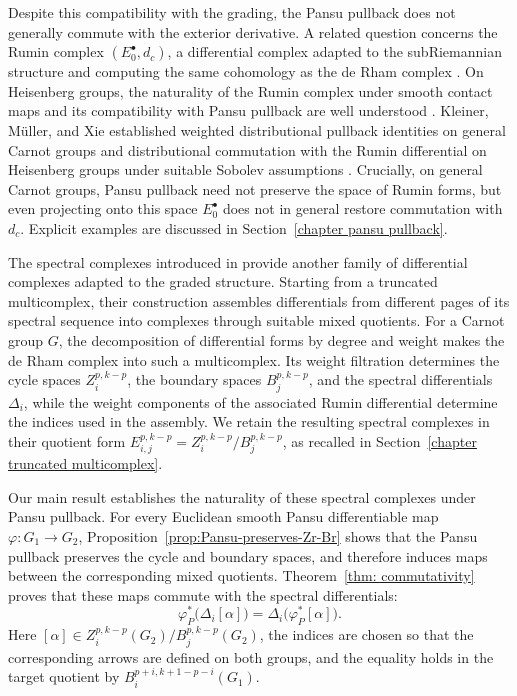 \documentclass[dvipsnames]{amsart}
\theoremstyle{definition}
\theoremstyle{definition}
\numberwithin{equation}{section}
\begin{document}
Despite this compatibility with the grading, the Pansu pullback does not generally commute with the exterior derivative. A related question concerns the Rumin complex $(E_0^\bullet,d_c)$, a differential complex adapted to the subRiemannian structure and computing the same cohomology as the de Rham complex \cite{rumin1999differential,rumin_palermo,CompensatedCompactness,FT}. On Heisenberg groups, the naturality of the Rumin complex under smooth contact maps and its compatibility with Pansu pullback are well understood \cite{canarecci2019insightrumincohomologyorientability}. Kleiner, M\"uller, and Xie established weighted distributional pullback identities on general Carnot groups and distributional commutation with the Rumin differential on Heisenberg groups under suitable Sobolev assumptions \cite{kleiner2020pansu,kleiner2021sobolevmappingsrumincomplex}. Crucially, on general Carnot groups, Pansu pullback need not preserve the space of Rumin forms, but even projecting onto this space $E_0^\bullet$ does not in general restore commutation with $d_c$. Explicit examples are discussed in Section~\ref{chapter pansu pullback}.


The spectral complexes introduced in
\cite{tripaldi2026spectralcomplexestruncatedmulticomplexes}
provide another family of differential complexes adapted
to the graded structure. Starting from a truncated
multicomplex, their construction assembles differentials
from different pages of its spectral sequence into
complexes through suitable mixed quotients. For a Carnot
group $G$, the decomposition of differential forms by
degree and weight makes the de Rham complex into such
a multicomplex. Its weight filtration determines the
cycle spaces $Z_i^{p,k-p}$, the boundary spaces
$B_j^{p,k-p}$, and the spectral differentials $\Delta_i$,
while the weight components of the associated Rumin
differential determine the indices used in the assembly.
We retain the resulting spectral complexes in their
quotient form $E_{i,j}^{p,k-p}
    =
    Z_i^{p,k-p}/B_j^{p,k-p}$,
as recalled in
Section~\ref{chapter truncated multicomplex}.

Our main result establishes the naturality of these
spectral complexes under Pansu pullback. For every
Euclidean smooth Pansu differentiable map
$\varphi:G_1\to G_2$,
Proposition~\ref{prop:Pansu-preserves-Zr-Br} shows that
the Pansu pullback preserves the cycle and boundary
spaces, and therefore induces maps between the
corresponding mixed quotients.
Theorem~\ref{thm: commutativity} proves that these maps
commute with the spectral differentials:
\[
    \varphi_P^*\bigl(\Delta_i[\alpha]\bigr)
    =
    \Delta_i\bigl(\varphi_P^*[\alpha]\bigr).
\]
Here $[\alpha]\in
Z_i^{p,k-p}(G_2)/B_j^{p,k-p}(G_2)$, the indices are
chosen so that the corresponding arrows are defined
on both groups, and the equality holds in the target
quotient by $B_i^{p+i,k+1-p-i}(G_1)$.
\end{document}
